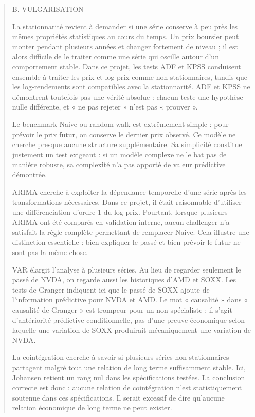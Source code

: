 \begin{quote}\small

B. VULGARISATION

La stationnarité revient à demander si une série conserve à peu près les mêmes propriétés statistiques au cours du temps. Un prix boursier peut monter pendant plusieurs années et changer fortement de niveau ; il est alors difficile de le traiter comme une série qui oscille autour d’un comportement stable. Dans ce projet, les tests ADF et KPSS conduisent ensemble à traiter les prix et log-prix comme non stationnaires, tandis que les log-rendements sont compatibles avec la stationnarité. ADF et KPSS ne démontrent toutefois pas une vérité absolue : chacun teste une hypothèse nulle différente, et « ne pas rejeter » n’est pas « prouver ».

Le benchmark Naive ou random walk est extrêmement simple : pour prévoir le prix futur, on conserve le dernier prix observé. Ce modèle ne cherche presque aucune structure supplémentaire. Sa simplicité constitue justement un test exigeant : si un modèle complexe ne le bat pas de manière robuste, sa complexité n’a pas apporté de valeur prédictive démontrée.

ARIMA cherche à exploiter la dépendance temporelle d’une série après les transformations nécessaires. Dans ce projet, il était raisonnable d’utiliser une différenciation d’ordre 1 du log-prix. Pourtant, lorsque plusieurs ARIMA ont été comparés en validation interne, aucun challenger n’a satisfait la règle complète permettant de remplacer Naive. Cela illustre une distinction essentielle : bien expliquer le passé et bien prévoir le futur ne sont pas la même chose.

VAR élargit l’analyse à plusieurs séries. Au lieu de regarder seulement le passé de NVDA, on regarde aussi les historiques d’AMD et SOXX. Les tests de Granger indiquent ici que le passé de SOXX ajoute de l’information prédictive pour NVDA et AMD. Le mot « causalité » dans « causalité de Granger » est trompeur pour un non-spécialiste : il s’agit d’antériorité prédictive conditionnelle, pas d’une preuve économique selon laquelle une variation de SOXX produirait mécaniquement une variation de NVDA.

La cointégration cherche à savoir si plusieurs séries non stationnaires partagent malgré tout une relation de long terme suffisamment stable. Ici, Johansen retient un rang nul dans les spécifications testées. La conclusion correcte est donc : aucune relation de cointégration n’est statistiquement soutenue dans ces spécifications. Il serait excessif de dire qu’aucune relation économique de long terme ne peut exister.


\end{quote}
